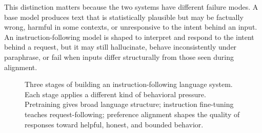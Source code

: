 This distinction matters because the two systems have different failure modes. A base model produces text that is statistically plausible but may be factually wrong, harmful in some contexts, or unresponsive to the intent behind an input. An instruction-following model is shaped to interpret and respond to the intent behind a request, but it may still hallucinate, behave inconsistently under paraphrase, or fail when inputs differ structurally from those seen during alignment.

\begin{figure}[t]
\centering
{}
\caption{Three stages of building an instruction-following language system. Each stage applies a different kind of behavioral pressure. Pretraining gives broad language structure; instruction fine-tuning teaches request-following; preference alignment shapes the quality of responses toward helpful, honest, and bounded behavior.}
\label{fig:instruction-pipeline}
\end{figure}

